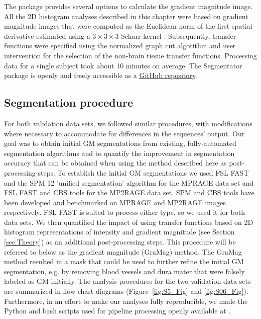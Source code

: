 The package provides several options to calculate the gradient magnitude image. All the 2D histogram analyses described in this chapter were based on gradient magnitude images that were computed as the Euclidean norm of the first spatial derivative estimated using a $3 \times 3 \times 3$ Scharr kernel \parencite{Scharr2000, Jahne2000}. Subsequently, transfer functions were specified using the normalized graph cut algorithm and user intervention for the selection of the non-brain tissue transfer functions. Processing data for a single subject took about 10 minutes on average. The Segmentator package is openly and freely accessible as a \href{https://github.com/ofgulban/segmentator}{GitHub repository}.

\subsection{Segmentation procedure}
For both validation data sets, we followed similar procedures, with modifications where necessary to accommodate for differences in the sequences' output. Our goal was to obtain initial GM segmentations from existing, fully-automated segmentation algorithms and to quantify the improvement in segmentation accuracy that can be obtained when using the method described here as post-processing steps. To establish the initial GM segmentations we used FSL FAST \parencite{Zhang2001} and the SPM 12 'unified segmentation' algorithm \parencite{Ashburner2005} for the MPRAGE data set and FSL FAST and CBS tools \parencite{Bazin2014} for the MP2RAGE data set. SPM and CBS tools have been developed and benchmarked on MPRAGE and MP2RAGE images respectively. FSL FAST is suited to process either type, so we used it for both data sets. We then quantified the impact of using transfer functions based on 2D histogram representations of intensity and gradient magnitude (see Section \ref{sec:Theory}) as an additional post-processing steps. This procedure will be referred to below as the gradient magnitude (GraMag) method. The GraMag method resulted in a mask that could be used to further refine the initial GM segmentation, e.g. by removing blood vessels and dura mater that were falsely labeled as GM initially. The analysis procedures for the two validation data sets are summarized in flow chart diagrams (Figure~\ref{fig:S5_Fig} and \ref{fig:S06_Fig}). Furthermore, in an effort to make our analyses fully reproducible, we made the Python and bash scripts used for pipeline processing openly available at \cite{segmentator_processing_scripts}.

